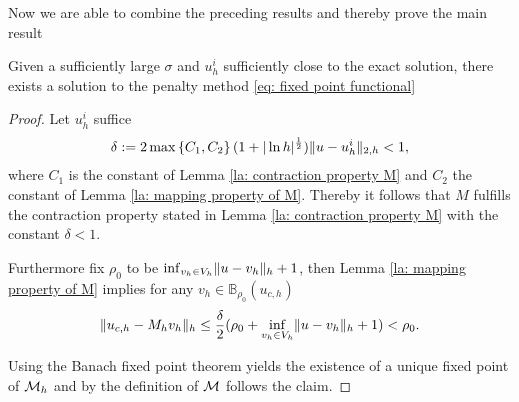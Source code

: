 Now we are able to combine the preceding results and thereby prove the main result
\begin{theorem}\label{main result}
	Given a sufficiently large $\sigma$ and $u_h^i$ sufficiently close to the exact solution, there exists a solution to the penalty method \eqref{eq: fixed point functional}
\end{theorem}
\begin{proof}
	Let $u_h^i$ suffice
	\begin{align}
		\delta := { 2 \operatorname{max} \left\{ C_1, C_2 \right\}  (1 + |\ln h|^{\frac 1 2}) \lVert u-u_h^i \rVert_{2,h} } < 1,
	\end{align}
	where $C_1$ is the constant of Lemma \ref{la: contraction property M} and $C_2$ the constant of Lemma \ref{la: mapping property of M}. Thereby it follows that $M$ fulfills the contraction property stated in Lemma \ref{la: contraction property M} with the constant $\delta<1$.
	
	Furthermore fix $\rho_0$ to be $\inf_{v_h \in V_h} \lVert u-v_h \rVert_{h}+1$, then Lemma \ref{la: mapping property of M} implies for any $v_h \in \mathbb{B}_{\rho_0}(u_{c,h})$
	 \[
	 	\lVert u_{c,h} - M_h v_h \rVert_{h} \leq  \frac \delta 2 (\rho_0 + \inf_{v_h \in V_h} \lVert u-v_h \rVert_{h}+1) < \rho_0.
	 \]
	 
	 Using the Banach fixed point theorem yields the existence of a unique fixed point of $\mathcal M_h$ and by the definition of $\mathcal M$ follows the claim.
\end{proof}

